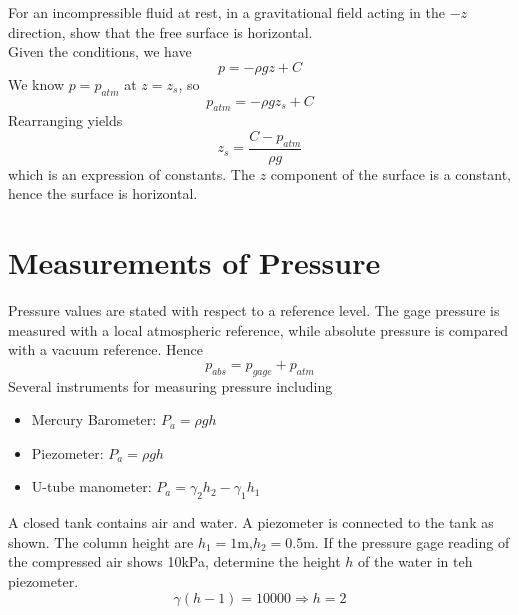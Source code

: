 \documentclass[12pt]{article}
\begin{document}
\begin{ex}
	For an incompressible fluid at rest, in a gravitational field acting in the $-z$ direction, show that the free surface is horizontal. \\
	Given the conditions, we have
	$$p = -\rho gz + C$$
	We know $p = p_{atm}$ at $z = z_s$, so
	$$p_{atm} = -\rho gz_s+C$$
	Rearranging yields
	$$z_s = \frac{C-p_{atm}}{\rho g}$$
	which is an expression of constants. The $z$ component of the surface is a constant, hence the surface is horizontal.
\end{ex}

\section{Measurements of Pressure}
Pressure values are stated with respect to a reference level. The gage pressure is measured with a local atmospheric reference, while absolute pressure is compared with a vacuum reference. Hence
$$p_{abs} = p_{gage} + p_{atm}$$
Several instruments for measuring pressure including
\begin{itemize}
	\item Mercury Barometer: $P_a = \rho gh$
	\item Piezometer: $P_a = \rho gh$
	\item U-tube manometer: $P_a = \gamma_2h_2 - \gamma_1h_1$
\end{itemize}

\begin{ex}
	A closed tank contains air and water. A piezometer is connected to the tank as shown. The column height are $h_1=1$m,$h_2=0.5$m. If the pressure gage reading of the compressed air shows 10kPa, determine the height $h$ of the water in teh piezometer. \\
	$$\gamma(h-1) = 10000 \Rightarrow h = 2$$
\end{ex}
\end{document}
